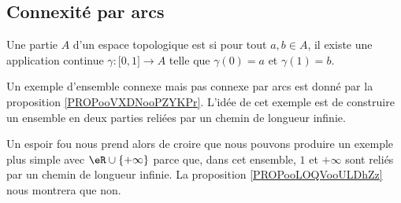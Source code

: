 \subsection{Connexité par arcs}

\begin{definition}      \label{DEFooOXVCooBizpgK}
	Une partie \( A\) d'un espace topologique est  si pour tout \( a,b \in A\), il existe une application continue \( \gamma\colon \mathopen[ 0 , 1 \mathclose]\to A\) telle que \( \gamma(0)=a\) et \( \gamma(1)=b\).
\end{definition}

\begin{normaltext}
	Un exemple d'ensemble connexe mais pas connexe par arcs est donné par la proposition \ref{PROPooVXDNooPZYKPr}. L'idée de cet exemple est de construire un ensemble en deux parties reliées par un chemin de longueur infinie.

	Un espoir fou nous prend alors de croire que nous pouvons produire un exemple plus simple avec \( \eR\cup\{ +\infty \}\) parce que, dans cet ensemble, \( 1\) et \( +\infty\) sont reliés par un chemin de longueur infinie. La proposition \ref{PROPooLOQVooULDhZz} nous montrera que non.
\end{normaltext}

